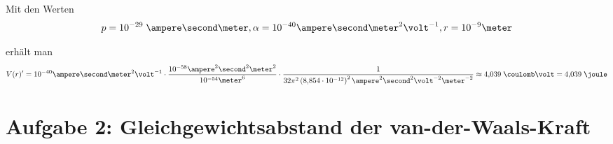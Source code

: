 \documentclass[a4paper,german,12pt,smallheadings]{scrartcl}
\begin{document}
Mit den Werten
\begin{equation}
  p = 10^{-29} \; \ampere \second \meter, \alpha = 10^{-40} \ampere \second \meter^2 \volt^{-1}, r = 10^{-9} \meter
\end{equation}

erhält man
\begin{equation}
  V(r)' = 10^{-40} \ampere \second \meter^2 \volt^{-1} \cdot \frac{10^{-58} \ampere^2 \second^2 \meter^2}{10^{-54} \meter^6}
  \cdot \frac{1}{32 \pi^2 \del{8{,}854 \cdot 10^{-12}}^2 \ampere^2 \second^2 \volt^{-2} \meter^{-2}}
  \approx 4{,}039 \; \coulomb \volt = 4{,}039 \; \joule
\end{equation}

\section*{Aufgabe 2: Gleichgewichtsabstand der van-der-Waals-Kraft}
\end{document}

